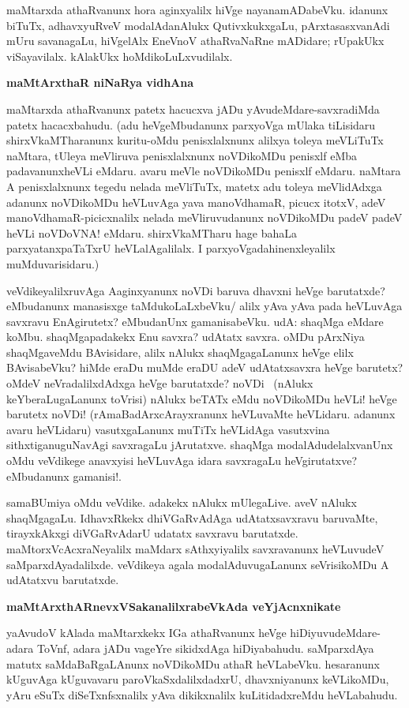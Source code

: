 maMtarxda athaRvanunx hora aginxyalilx hiVge nayanamADabeVku. idanunx biTuTx, adhavxyuRveV modalAdanAlukx QutivxkukxgaLu, pArxtasasxvanAdi mUru savanagaLu, hiVgelAlx EneVnoV athaRvaNaRne mADidare; rUpakUkx viSayavilalx. kAlakUkx hoMdikoLuLxvudilalx.

\noindent
\textbf{maMtArxthaR niNaRya vidhAna}\label{page118}

maMtarxda athaRvanunx patetx hacucxva jADu yAvudeMdare-savxradiMda patetx hacacxbahudu. (adu heVgeMbudanunx parxyoVga mUlaka tiLisidaru shirxVkaMTharanunx kuritu-oMdu penisxlalxnunx alilxya toleya meVLiTuTx naMtara, tUleya meVliruva penisxlalxnunx noVDikoMDu penisxlf eMba padavanunxheVLi eMdaru. avaru meVle noVDikoMDu penisxlf eMdaru. naMtara A penisxlalxnunx tegedu nelada meVliTuTx, matetx adu toleya meVlidAdxga adanunx noVDikoMDu heVLuvAga yava manoVdhamaR, picucx itotxV, adeV manoVdhamaR-picicxnalilx nelada meVliruvudanunx noVDikoMDu padeV padeV heVLi noVDoVNA! eMdaru. shirxVkaMTharu hage bahaLa parxyatanxpaTaTxrU heVLalAgalilalx. I parxyoVgadahinenxleyalilx muMduvarisidaru.)

veVdikeyalilxruvAga Aaginxyanunx noVDi baruva dhavxni heVge barutatxde? 
eMbudanunx manasisxge taMdukoLaLxbeVku/ alilx yAva yAva pada heVLuvAga 
savxravu EnAgirutetx? eMbudanUnx gamanisabeVku. udA: shaqMga eMdare 
koMbu. shaqMgapadakekx Enu savxra? udAtatx savxra. oMDu pArxNiya 
shaqMgaveMdu BAvisidare, alilx nAlukx shaqMgagaLanunx heVge elilx 
BAvisabeVku? hiMde eraDu muMde eraDU adeV udAtatxsavxra heVge barutetx? 
oMdeV neVradalilxdAdxga heVge barutatxde? noVDi~ (nAlukx keYberaLugaLanunx toVrisi) nAlukx beTATx eMdu noVDikoMDu heVLi! heVge barutetx noVDi! (rAmaBadArxcArayxranunx heVLuvaMte heVLidaru. adanunx avaru heVLidaru) vasutxgaLanunx muTiTx heVLidAga vasutxvina sithxtiganuguNavAgi savxragaLu jArutatxve. shaqMga modalAdudelalxvanUnx oMdu veVdikege anavxyisi heVLuvAga idara savxragaLu heVgirutatxve? eMbudanunx gamanisi!.

samaBUmiya oMdu veVdike. adakekx nAlukx mUlegaLive. aveV nAlukx 
shaqMgagaLu. IdhavxRkekx dhiVGaRvAdAga udAtatxsavxravu baruvaMte, 
tirayxkAkxgi diVGaRvAdarU udatatx savxravu barutatxde. 
maMtorxVcAcxraNeyalilx maMdarx sAthxyiyalilx savxravanunx heVLuvudeV 
saMparxdAyadalilxde. veVdikeya agala modalAduvugaLanunx seVrisikoMDu A udAtatxvu barutatxde.

\noindent
\textbf{maMtArxthARnevxVSakanalilxrabeVkAda veYjAcnxnikate}\label{page119}

yaAvudoV kAlada maMtarxkekx IGa athaRvanunx heVge hiDiyuvudeMdare-adara ToVnf, adara jADu vageYre sikidxdAga hiDiyabahudu. saMparxdAya matutx saMdaBaRgaLAnunx noVDikoMDu athaR heVLabeVku. hesaranunx kUguvAga kUguvavaru paroVkaSxdalilxdadxrU, dhavxniyanunx keVLikoMDu, yAru eSuTx diSeTxnfsxnalilx yAva dikikxnalilx kuLitidadxreMdu heVLabahudu.

